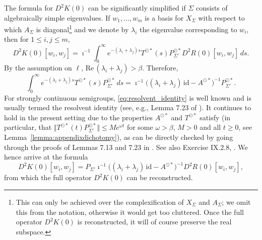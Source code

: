 \documentclass[a4paper, 12pt, oneside, reqno, notitlepage]{amsart}
\theoremstyle{plain}
\theoremstyle{definition}
\theoremstyle{remark}
\begin{document}
The formula for $D^2K(0)$ can be significantly simplified if $\Sigma$ consists of algebraically simple eigenvalues.
If $w_1,\ldots,w_m$ is a basis for $X_\Sigma$ with respect to which $A_\Sigma$ is diagonal\footnote{This can only be achieved over the complexification of $X_\Sigma$ and $A_\Sigma$; we omit this from the notation, otherwise it would get too cluttered. Once the full operator $D^2K(0)$ is reconstructed, it will of course preserve the real subspace.} and we denote by $\lambda_i$ the eigenvalue corresponding to $w_i$, then for $1 \leq i,j \leq m$,
\begin{displaymath}
    D^2K(0)[w_i,w_j] = \imath^{-1} \int_{0}^\infty e^{- (\lambda_i + \lambda_j)s} T^{\odot *}(s) P_{\Sigma'}^{\odot *}  D^2R(0)[w_i,w_j] \, ds  .
\end{displaymath}
By the assumption on $\ell$, $ \mathrm{Re} \, (\lambda_i+\lambda_j) > \beta$.
Therefore,
\begin{equation}
    \int_{0}^\infty e^{- (\lambda_i + \lambda_j)s} T^{\odot *}(s) P_{\Sigma'}^{\odot *} \, ds = \imath^{-1} \big((\lambda_i+\lambda_j) \, \mathrm{id} - A^{\odot *} \big)^{-1} P_{\Sigma'}^{\odot *}.
    \label{eq:resolvent_identity}
\end{equation}
For strongly continuous semigroups,  \eqref{eq:resolvent_identity} is well known and is usually termed the resolvent identity (see, e.g., Lemma 7.23 of \cite{buhler2018functional}).
It continues to hold in the present setting due to the properties $A^{\odot *}$ and $T^{\odot *}$ satisfy (in particular, that $\Vert T^{\odot *}(t) P_{\Sigma'}^{\odot *} \Vert \leq Me^{\omega t}$ for  some $\omega > \beta$, $M>0$ and all $t \geq 0$, see Lemma~\ref{lemma:appendixdichotomy}), as can be directly checked by going through the proofs of Lemmas 7.13 and 7.23 in \cite{buhler2018functional}. 
See also Exercise IX.2.8, \cite{diekmann2012delay}.
We hence arrive at the formula 
\begin{displaymath}
    D^2K(0)[w_i,w_j] =P_{\Sigma'} \imath^{-1} \big((\lambda_i+\lambda_j) \, \mathrm{id} - A^{\odot *} \big)^{-1} D^2R(0)[w_i,w_j],
\end{displaymath}
from which the full operator $D^2K(0)$ can be reconstructed.
\end{document}
